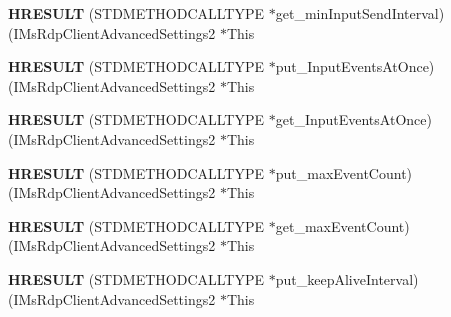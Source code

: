 \begin{DoxyCompactItemize}
\item 
\mbox{\label{struct_i_ms_rdp_client_advanced_settings2_vtbl_a7d9424ffac618ca10dbeee918f6156a7}} 
{\bfseries H\+R\+E\+S\+U\+LT} (S\+T\+D\+M\+E\+T\+H\+O\+D\+C\+A\+L\+L\+T\+Y\+PE $\ast$get\+\_\+min\+Input\+Send\+Interval)(I\+Ms\+Rdp\+Client\+Advanced\+Settings2 $\ast$This
\item 
\mbox{\label{struct_i_ms_rdp_client_advanced_settings2_vtbl_af9783b6f925a196494e4a67a07e513b9}} 
{\bfseries H\+R\+E\+S\+U\+LT} (S\+T\+D\+M\+E\+T\+H\+O\+D\+C\+A\+L\+L\+T\+Y\+PE $\ast$put\+\_\+\+Input\+Events\+At\+Once)(I\+Ms\+Rdp\+Client\+Advanced\+Settings2 $\ast$This
\item 
\mbox{\label{struct_i_ms_rdp_client_advanced_settings2_vtbl_a47add827a5df7384a46058d291a38156}} 
{\bfseries H\+R\+E\+S\+U\+LT} (S\+T\+D\+M\+E\+T\+H\+O\+D\+C\+A\+L\+L\+T\+Y\+PE $\ast$get\+\_\+\+Input\+Events\+At\+Once)(I\+Ms\+Rdp\+Client\+Advanced\+Settings2 $\ast$This
\item 
\mbox{\label{struct_i_ms_rdp_client_advanced_settings2_vtbl_a862f97df8e59e313333d201a37cdea06}} 
{\bfseries H\+R\+E\+S\+U\+LT} (S\+T\+D\+M\+E\+T\+H\+O\+D\+C\+A\+L\+L\+T\+Y\+PE $\ast$put\+\_\+max\+Event\+Count)(I\+Ms\+Rdp\+Client\+Advanced\+Settings2 $\ast$This
\item 
\mbox{\label{struct_i_ms_rdp_client_advanced_settings2_vtbl_ac2a80a066881e0429075c6ebd6583f3e}} 
{\bfseries H\+R\+E\+S\+U\+LT} (S\+T\+D\+M\+E\+T\+H\+O\+D\+C\+A\+L\+L\+T\+Y\+PE $\ast$get\+\_\+max\+Event\+Count)(I\+Ms\+Rdp\+Client\+Advanced\+Settings2 $\ast$This
\item 
\mbox{\label{struct_i_ms_rdp_client_advanced_settings2_vtbl_a7dde2258d13cdb3787b6fff90aa29f47}} 
{\bfseries H\+R\+E\+S\+U\+LT} (S\+T\+D\+M\+E\+T\+H\+O\+D\+C\+A\+L\+L\+T\+Y\+PE $\ast$put\+\_\+keep\+Alive\+Interval)(I\+Ms\+Rdp\+Client\+Advanced\+Settings2 $\ast$This
\item 
\mbox{\label{struct_i_ms_rdp_client_advanced_settings2_vtbl_a25ccd720a84fcc693f31b94e1bc4da46}} 

\end{DoxyCompactItemize}
